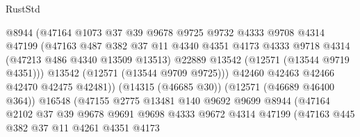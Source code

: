 \begin{lexlean}{RustStd}
\begin{coremodule}
                                @8944
                                (@47164
                                  @1073
                                  @37
                                  @39
                                  @9678
                                  @9725
                                  @9732
                                  @4333
                                  @9708
                                  @4314
                                  @47199
                                  (@47163
                                    @487
                                    @382
                                    @37
                                    @11
                                    @4340
                                    @4351
                                    @4173
                                    @4333
                                    @9718
                                    @4314
                                    (@47213 @486 @4340 @13509 @13513)
                                    @22889
                                    @13542
                                    (@12571 (@13544 @9719 @4351)))
                                  @13542
                                  (@12571 (@13544 @9709 @9725)))
                                @42460
                                @42463
                                @42466
                                @42470
                                @42475
                                @42481))
                            (@14315 (@46685 @30))
                            (@12571 (@46689 @46400 @364))
                            @16548
                            (@47155
                              @2775
                              @13481
                              @140
                              @9692
                              @9699
                              @8944
                              (@47164
                                @2102
                                @37
                                @39
                                @9678
                                @9691
                                @9698
                                @4333
                                @9672
                                @4314
                                @47199
                                (@47163
                                  @445
                                  @382
                                  @37
                                  @11
                                  @4261
                                  @4351
                                  @4173

\end{coremodule}
\end{lexlean}
